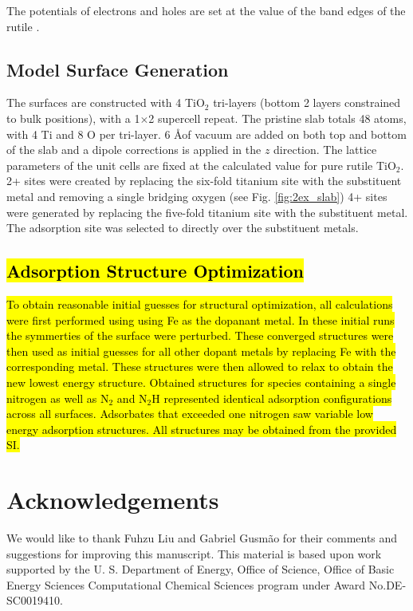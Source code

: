 The potentials of electrons and holes are set at the value of the band edges of the rutile \cite{Nozik_1996}.

\subsection{Model Surface Generation}
 The surfaces are constructed with 4 TiO$_2$ tri-layers (bottom 2 layers constrained to bulk positions), with a 1$\times$2 supercell repeat. The pristine slab totals 48 atoms, with 4 Ti and 8 O per tri-layer. 6 \AA  of vacuum are added on both top and bottom of the slab and a dipole corrections is applied in the $z$ direction\cite{Dipole_paper}. The lattice parameters of the unit cells are fixed at the calculated value for pure rutile TiO$_2$. 2+ sites were created by replacing the six-fold titanium site with the substituent metal and removing a single bridging oxygen (see Fig. \ref{fig:2ex_slab}) 4+ sites were generated by replacing the five-fold titanium site with the substituent metal. The adsorption site was selected to directly over the substituent metals. 
 
\subsection{\hl{Adsorption Structure Optimization}}
 \hl{To obtain reasonable initial guesses for structural optimization, all calculations were first performed using using Fe as the dopanant metal. In these initial runs the symmerties of the surface were perturbed. These converged structures were then used as initial guesses for all other dopant metals by replacing Fe with the corresponding metal. These structures were then allowed to relax to obtain the new lowest energy structure. Obtained structures for  species containing a single nitrogen as well  as N$_2$ and N$_2$H represented identical adsorption configurations across all surfaces. Adsorbates that exceeded one nitrogen saw variable low energy adsorption structures. All structures may be obtained from the provided SI.}

\section{Acknowledgements}
We would like to thank Fuhzu Liu and Gabriel Gusm\~ao for their comments and suggestions for improving this manuscript. This material is based upon work supported by the U. S. Department of Energy, Office of Science, Office of Basic Energy Sciences Computational Chemical Sciences program under Award No.DE-SC0019410.

%
%

\appendix
%


